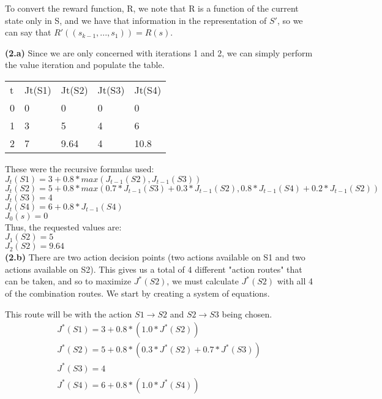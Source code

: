 \documentclass[11pt]{article}
\renewcommand{\part}[1] {\vspace{.10in} {\bf (#1)}}
\begin{document}
To convert the reward function, R, we note that R is a function of the current state only in S, and we have that information in the representation of $S'$, so we can say that $R'((s_{k-1}, ..., s_1)) = R(s)$. 



\part{2.a}
Since we are only concerned with iterations 1 and 2, we can simply perform the value iteration and populate the table.

\begin{tabular}{|l|l|l|l|l|}
t & Jt(S1) & Jt(S2) & Jt(S3) & Jt(S4) \\
0 & 0 & 0 & 0 & 0 \\
1 & 3 & 5 & 4 & 6 \\
2 & 7 & 9.64 & 4 & 10.8 \\
\end{tabular}

These were the recursive formulas used:\\
$J_t(S1) = 3 + 0.8 * max(J_{t-1}(S2), J_{t-1}(S3))$\\
$J_t(S2) = 5 + 0.8 * max(0.7*J_{t-1}(S3)+0.3*J_{t-1}(S2), 0.8*J_{t-1}(S4)+0.2*J_{t-1}(S2))$\\
$J_t(S3) = 4$\\
$J_t(S4) = 6 + 0.8 * J_{t-1}(S4)$\\
$J_0(s) = 0$\\

Thus, the requested values are:\\
$J_1(S2) = 5$\\
$J_2(S2) = 9.64$\\

\part{2.b}
There are two action decision points (two actions available on S1 and two actions available on S2). This gives us a total of 4 different "action routes" that can be taken, and so to maximize $J^*(S2)$, we must calculate $J^*(S2)$ with all 4 of the combination routes. We start by creating a system of equations.

This route will be with the action $S1 \rightarrow S2$ and $S2 \rightarrow S3$ being chosen.
\begin{eqnarray*}
J^*(S1) = 3 + 0.8*(1.0 * J^*(S2))\\
J^*(S2) = 5 + 0.8*(0.3*J^*(S2) + 0.7*J^*(S3))\\
J^*(S3) = 4\\
J^*(S4) = 6 + 0.8*(1.0 * J^*(S4))\\
\end{eqnarray*}
\end{document}
